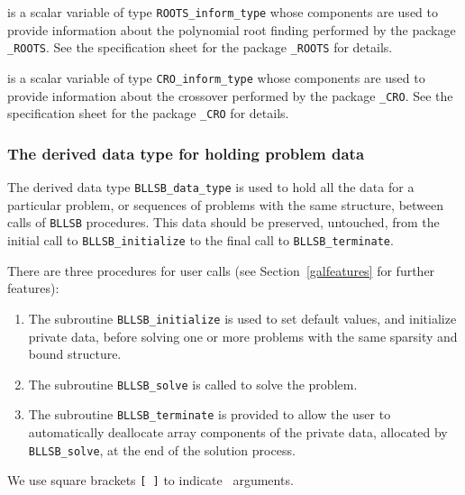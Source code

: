 \documentclass{galahad}
\newcommand{\packagename}{BLLSB}
\begin{document}
\begin{description}
 is a scalar variable of type
{\tt ROOTS\_inform\_type}
whose components are used to provide information about the
polynomial root finding performed by the package
{\tt \libraryname\_ROOTS}.
See the specification sheet for the package
{\tt \libraryname\_ROOTS} for details.

 is a scalar variable of type
{\tt CRO\_inform\_type}
whose components are used to provide information about the crossover
performed by the package
{\tt \libraryname\_CRO}.
See the specification sheet for the package
{\tt \libraryname\_CRO} for details.

\end{description}



\subsubsection{The derived data type for holding problem data}\label{typedata}
The derived data type
{\tt \packagename\_data\_type}
is used to hold all the data for a particular problem,
or sequences of problems with the same structure, between calls of
{\tt \packagename} procedures.
This data should be preserved, untouched, from the initial call to
{\tt \packagename\_initialize}
to the final call to
{\tt \packagename\_terminate}.


\galarguments
There are three procedures for user calls
(see Section~\ref{galfeatures} for further features):

\begin{enumerate}
\item The subroutine
      {\tt \packagename\_initialize}
      is used to set default values, and initialize private data,
      before solving one or more problems with the
      same sparsity and bound structure.
\item The subroutine
      {\tt \packagename\_solve}
      is called to solve the problem.
\item The subroutine
      {\tt \packagename\_terminate}
      is provided to allow the user to automatically deallocate array
       components of the private data, allocated by
       {\tt \packagename\_solve},
       at the end of the solution process.
\end{enumerate}
We use square brackets {\tt [ ]} to indicate \optional\ arguments.
\end{document}
